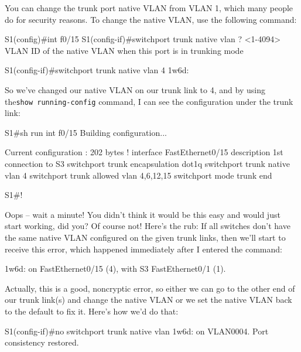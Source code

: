 You can change the trunk port native VLAN from VLAN 1, which many people
do for security reasons. To change the native VLAN, use the following
command:

\begin{cli}
S1(config)#int f0/15
S1(config-if)#switchport trunk native vlan ?
  <1-4094>  VLAN ID of the native VLAN when this port is in trunking mode
\end{cli}

\begin{cli}
S1(config-if)#switchport trunk native vlan 4
1w6d: %
\end{cli}

So we've changed our native VLAN on our trunk link to 4, and by using
the\texttt{show\ running-config} command, I can see the configuration
under the trunk link:

\begin{cli}
S1#sh run int f0/15
Building configuration...
\end{cli}

\begin{cli}
Current configuration : 202 bytes
!
interface FastEthernet0/15
 description 1st connection to S3
 switchport trunk encapsulation dot1q
 switchport trunk native vlan 4
 switchport trunk allowed vlan 4,6,12,15
 switchport mode trunk
end
\end{cli}

\begin{cli}
S1#!
\end{cli}

Oops -- wait a minute! You didn't think it would be this easy and would
just start working, did you? Of course not! Here's the rub: If all
switches don't have the same native VLAN configured on the given trunk
links, then we'll start to receive this error, which happened
immediately after I entered the command:

\begin{cli}
1w6d: %
on FastEthernet0/15 (4), with S3 FastEthernet0/1 (1).
\end{cli}

Actually, this is a good, noncryptic error, so either we can go to the
other end of our trunk link(s) and change the native VLAN or we set the
native VLAN back to the default to fix it. Here's how we'd do that:

\begin{cli}
S1(config-if)#no switchport trunk native vlan
1w6d: %
on VLAN0004. Port consistency restored.
\end{cli}

